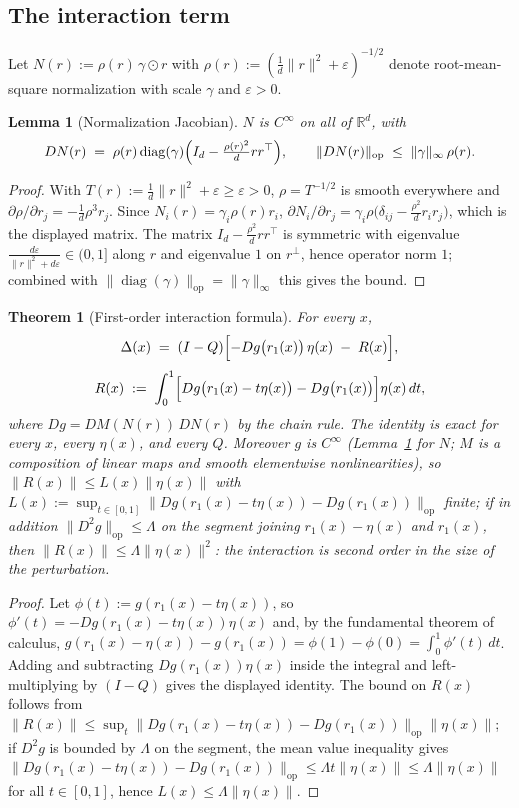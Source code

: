 \documentclass[11pt,a4paper]{article}
\newtheorem{theorem}{Theorem}
\newtheorem{lemma}{Lemma}
\begin{document}
\subsection{The interaction term}

Let $N(r):=\rho(r)\,\gamma\odot r$ with $\rho(r):=(\tfrac1d\|r\|^2+\varepsilon)^{-1/2}$
denote root-mean-square normalization with scale $\gamma$ and $\varepsilon>0$.

\begin{lemma}[Normalization Jacobian]
\label{lem:jacobian}
$N$ is $C^\infty$ on all of $\mathbb R^d$, with
\[
DN(r) \;=\; \rho(r)\operatorname{diag}(\gamma)
\Bigl(I_d - \tfrac{\rho(r)^2}{d}rr^\top\Bigr),
\qquad
\|DN(r)\|_{\mathrm{op}} \;\le\; \|\gamma\|_\infty\,\rho(r).
\]
\end{lemma}

\begin{proof}
With $T(r):=\tfrac1d\|r\|^2+\varepsilon\ge\varepsilon>0$, $\rho=T^{-1/2}$ is
smooth everywhere and $\partial\rho/\partial r_j=-\tfrac1d\rho^3 r_j$. Since
$N_i(r)=\gamma_i\rho(r)r_i$,
$\partial N_i/\partial r_j=\gamma_i\rho\bigl(\delta_{ij}-\tfrac{\rho^2}{d}r_ir_j\bigr)$,
which is the displayed matrix. The matrix $I_d-\tfrac{\rho^2}{d}rr^\top$ is
symmetric with eigenvalue $\tfrac{d\varepsilon}{\|r\|^2+d\varepsilon}\in(0,1]$
along $r$ and eigenvalue $1$ on $r^\perp$, hence operator norm $1$; combined
with $\|\operatorname{diag}(\gamma)\|_{\mathrm{op}}=\|\gamma\|_\infty$ this
gives the bound.
\end{proof}

\begin{theorem}[First-order interaction formula]
\label{thm:interaction}
For every $x$,
\[
\Delta(x) \;=\; (I-Q)\Bigl[-Dg\bigl(r_1(x)\bigr)\,\eta(x) \;-\; R(x)\Bigr],
\]
\[
R(x) \;:=\; \int_0^1\Bigl[Dg\bigl(r_1(x)-t\eta(x)\bigr)-Dg\bigl(r_1(x)\bigr)\Bigr]\eta(x)\,dt,
\]
where $Dg=DM(N(r))\,DN(r)$ by the chain rule. The identity is exact for every
$x$, every $\eta(x)$, and every $Q$. Moreover $g$ is $C^\infty$
(Lemma~\ref{lem:jacobian} for $N$; $M$ is a composition of linear maps and
smooth elementwise nonlinearities), so $\|R(x)\|\le L(x)\|\eta(x)\|$ with
$L(x):=\sup_{t\in[0,1]}\|Dg(r_1(x)-t\eta(x))-Dg(r_1(x))\|_{\mathrm{op}}$
finite; if in addition $\|D^2g\|_{\mathrm{op}}\le\Lambda$ on the segment
joining $r_1(x)-\eta(x)$ and $r_1(x)$, then $\|R(x)\|\le\Lambda\|\eta(x)\|^2$:
the interaction is second order in the size of the perturbation.
\end{theorem}

\begin{proof}
Let $\phi(t):=g(r_1(x)-t\eta(x))$, so $\phi'(t)=-Dg(r_1(x)-t\eta(x))\eta(x)$
and, by the fundamental theorem of calculus,
$g(r_1(x)-\eta(x))-g(r_1(x))=\phi(1)-\phi(0)=\int_0^1\phi'(t)\,dt$. Adding and
subtracting $Dg(r_1(x))\eta(x)$ inside the integral and left-multiplying by
$(I-Q)$ gives the displayed identity. The bound on $R(x)$ follows from
$\|R(x)\|\le\sup_t\|Dg(r_1(x)-t\eta(x))-Dg(r_1(x))
\|_{\mathrm{op}}\|\eta(x)\|$; if $D^2g$ is bounded by $\Lambda$ on the segment,
the mean value inequality gives
$\|Dg(r_1(x)-t\eta(x))-Dg(r_1(x))\|_{\mathrm{op}}\le\Lambda t\|\eta(x)\|
\le\Lambda\|\eta(x)\|$ for all $t\in[0,1]$, hence $L(x)\le\Lambda\|\eta(x)\|$.
\end{proof}
\end{document}
